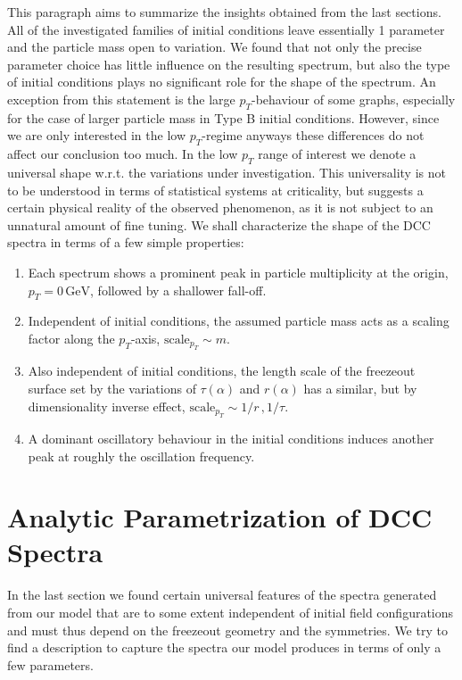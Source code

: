 This paragraph aims to summarize the insights obtained from the last sections. All of the investigated families of initial conditions leave essentially 1 parameter and the particle mass open to variation. We found that not only the precise parameter choice has little influence on the resulting spectrum, but also the type of initial conditions plays no significant role for the shape of the spectrum. An exception from this statement is the large $p_T$-behaviour of some graphs, especially for the case of larger particle mass in Type B initial conditions. However, since we are only interested in the low $p_T$-regime anyways these differences do not affect our conclusion too much. In the low $p_T$ range of interest we denote a universal shape w.r.t. the variations under investigation. This universality is not to be understood in terms of statistical systems at criticality, but suggests a certain physical reality of the observed phenomenon, as it is not subject to an unnatural amount of fine tuning. We shall characterize the shape of the DCC spectra in terms of a few simple properties:
\begin{enumerate}
    \item Each spectrum shows a prominent peak in particle multiplicity at the origin, ${p_T=0\,\mathrm{GeV}}$, followed by a shallower fall-off.
    \item Independent of initial conditions, the assumed particle mass acts as a scaling factor along the $p_T$-axis, $\text{scale}_{p_T}\sim m$.
    \item Also independent of initial conditions, the length scale of the freezeout surface set by the variations of $\tau(\alpha)$ and $r(\alpha)$ has a similar, but by dimensionality inverse effect, $\text{scale}_{p_T}\sim 1/r\,,1/\tau$.
    \item A dominant oscillatory behaviour in the initial conditions induces another peak at roughly the oscillation frequency.
\end{enumerate}


\section{Analytic Parametrization of DCC Spectra}

In the last section we found certain universal features of the spectra generated from our model that are to some extent independent of initial field configurations and must thus depend on the freezeout geometry and the symmetries. We try to find a description to capture the spectra our model produces in terms of only a few parameters.

